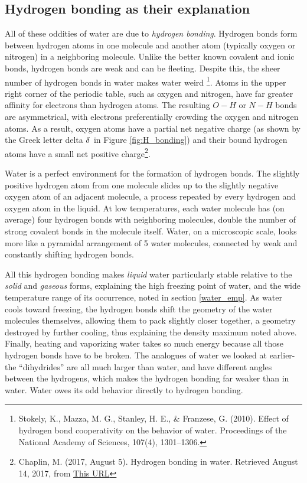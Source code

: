 \documentclass[amstex,12pt]{book}
\begin{document}
\subsection{Hydrogen bonding as their explanation}
All of these oddities of water are due to \emph{hydrogen bonding}. Hydrogen bonds form between hydrogen atoms in one molecule and another atom (typically oxygen or nitrogen) in a neighboring molecule. Unlike the better known covalent and ionic bonds, hydrogen bonds are weak and can be fleeting. Despite this, the sheer number of hydrogen bonds in water makes water weird \footnote{Stokely, K., Mazza, M. G., Stanley, H. E., \& Franzese, G. (2010). Effect of hydrogen bond cooperativity on the behavior of water. Proceedings of the National Academy of Sciences, 107(4), 1301–1306.}. Atoms in the upper right corner of the periodic table, such as oxygen and nitrogen, have far greater affinity for electrons than hydrogen atoms. The resulting $O-H$ or $N-H$ bonds are asymmetrical, with electrons preferentially crowding the oxygen and nitrogen atoms. As a result, oxygen atoms have a partial net negative charge (as shown by the Greek letter delta $\delta^{\-}$ in Figure \ref{fig:H_bonding}) and their bound hydrogen atoms have a small net positive charge\footnote{Chaplin, M. (2017, August 5). Hydrogen bonding in water. Retrieved August 14, 2017, from \href{http://www1.lsbu.ac.uk/water/water_hydrogen_bonding.html}{This URL}}. 

Water is a perfect environment for the formation of hydrogen bonds. The slightly positive hydrogen atom from one molecule slides up to the slightly negative oxygen atom of an adjacent molecule, a process repeated by every hydrogen and oxygen atom in the liquid. At low temperatures, each water molecule has (on average) four hydrogen bonds with neighboring molecules, double the number of strong covalent bonds in the molecule itself. Water, on a microscopic scale, looks more like a pyramidal arrangement of 5 water molecules, connected by weak and constantly shifting hydrogen bonds. 
 
All this hydrogen bonding makes \emph{liquid} water particularly stable relative to the \emph{solid} and \emph{gaseous} forms, explaining the high freezing point of water, and the wide temperature range of its occurrence, noted in section \ref{water_emp}. As water cools toward freezing, the hydrogen bonds shift the geometry of the water molecules themselves, allowing them to pack slightly closer together, a geometry destroyed by further cooling, thus explaining the density maximum noted above. Finally, heating and vaporizing water takes so much energy because all those hydrogen bonds have to be broken. The analogues of water we looked at earlier-the ``dihydrides'' are all much larger than water, and have different angles between the hydrogens, which makes the hydrogen bonding far weaker than in water. Water owes its odd behavior directly to hydrogen bonding.           
\end{document}
